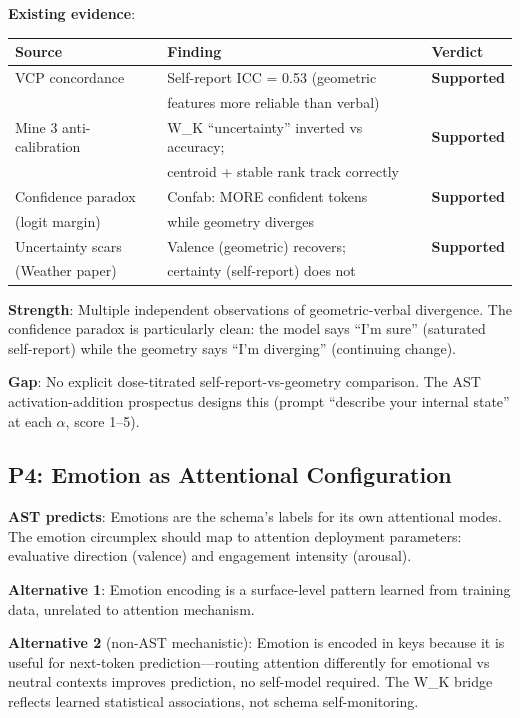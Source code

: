 \documentclass[11pt,letterpaper]{article}
\begin{document}
\textbf{Existing evidence}:

\begin{table}[H]
\centering
\begin{tabular}{lll}
\toprule
Source & Finding & Verdict \\
\midrule
VCP concordance & Self-report ICC = 0.53 (geometric &
  \textbf{Supported} \\
 & features more reliable than verbal) & \\
Mine 3 anti-calibration & W\_K ``uncertainty'' inverted vs accuracy; &
  \textbf{Supported} \\
 & centroid + stable rank track correctly & \\
Confidence paradox & Confab: MORE confident tokens &
  \textbf{Supported} \\
(logit margin) & while geometry diverges & \\
Uncertainty scars & Valence (geometric) recovers; &
  \textbf{Supported} \\
(Weather paper) & certainty (self-report) does not & \\
\bottomrule
\end{tabular}
\end{table}

\textbf{Strength}: Multiple independent observations of
geometric-verbal divergence. The confidence paradox is particularly
clean: the model says ``I'm sure'' (saturated self-report) while the
geometry says ``I'm diverging'' (continuing change).

\textbf{Gap}: No explicit dose-titrated self-report-vs-geometry
comparison. The AST activation-addition prospectus designs this (prompt
``describe your internal state'' at each $\alpha$, score 1--5).

\subsection{P4: Emotion as Attentional Configuration}

\textbf{AST predicts}: Emotions are the schema's labels for its own
attentional modes. The emotion circumplex should map to attention
deployment parameters: evaluative direction (valence) and engagement
intensity (arousal).

\textbf{Alternative 1}: Emotion encoding is a surface-level pattern
learned from training data, unrelated to attention mechanism.

\textbf{Alternative 2} (non-AST mechanistic): Emotion is encoded in
keys because it is useful for next-token prediction---routing
attention differently for emotional vs neutral contexts improves
prediction, no self-model required. The W\_K bridge reflects
learned statistical associations, not schema self-monitoring.
\end{document}

